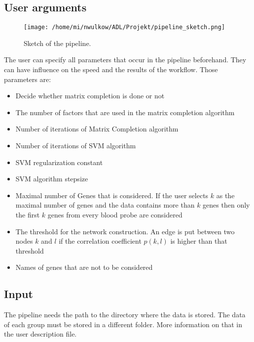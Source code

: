 \documentclass{bioinfo}
\begin{document}
 

\subsection{User arguments}
\begin{figure}[!ht]
\centering
\texttt{[image: /home/mi/nwulkow/ADL/Projekt/pipeline\_sketch.png]}
\caption{Sketch of the pipeline.}
\label{data_readin_geneslist}
\end{figure}

    The user can specify all parameters that occur in the pipeline beforehand. They can have influence on the speed and the results of the workflow. Those parameters are:
\begin{itemize}
\item Decide whether matrix completion is done or not
\item The number of factors that are used in the matrix completion algorithm
\item Number of iterations of Matrix Completion algorithm
\item Number of iterations of SVM algorithm
\item SVM regularization constant
\item SVM algorithm stepsize
\item Maximal number of Genes that is considered. If the user selects $k$ as the maximal number of genes and the data contains more than $k$ genes then only the first $k$ genes from every blood probe are considered
\item The threshold for the network construction. An edge is put between two nodes $k$ and $l$ if the correlation coefficient $p(k,l)$ is higher than that threshold
\item Names of genes that are not to be considered
\end{itemize}

\subsection{Input}
The pipeline needs the path to the directory where the data is stored. The data of each group must be stored in a different folder. More information on that in the user description file.
\end{document}

